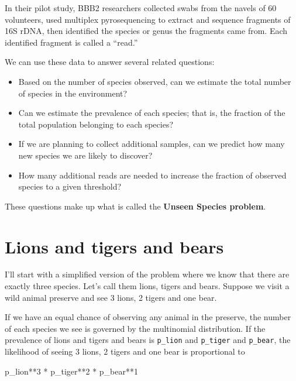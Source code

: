 \documentclass[12pt]{book}
\theoremstyle{exercise}
\begin{document}
In their pilot study, BBB2 researchers collected swabs from the navels
of 60 volunteers, used multiplex pyrosequencing to extract and sequence
fragments of 16S rDNA, then identified the species or genus the
fragments came from.  Each identified fragment is called a ``read.''

We can use these data to answer several related questions:

\begin{itemize}

\item Based on the number of species observed, can we estimate
  the total number of species in the environment?

\item Can we estimate the prevalence of each species; that is, the
  fraction of the total population belonging to each species?

\item If we are planning to collect additional samples, can we predict
  how many new species we are likely to discover?

\item How many additional reads are needed to increase the
  fraction of observed species to a given threshold?

\end{itemize}

These questions make up what is called the {\bf Unseen Species problem}.


\section{Lions and tigers and bears}

I'll start with a simplified version of the problem where we know that
there are exactly three species.  Let's call them lions, tigers and
bears.  Suppose we visit a wild animal preserve and see 3 lions, 2
tigers and one bear.

If we have an equal chance of observing any animal in the preserve,
the number of each species we see is governed by the multinomial
distribution.  If the prevalence of lions and tigers and bears is
\verb"p_lion" and \verb"p_tiger" and \verb"p_bear", the likelihood of
seeing 3 lions, 2 tigers and one bear is proportional to

\begin{code}
p_lion**3 * p_tiger**2 * p_bear**1
\end{code}
\end{document}

